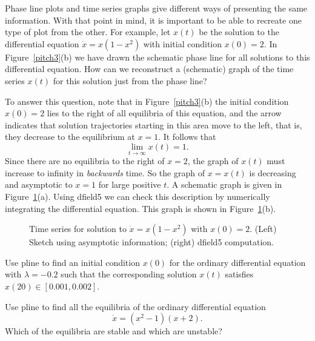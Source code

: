 Phase line plots and time series graphs give different ways of
presenting the same information.  With that point in mind, it is
important to be able to recreate one type of plot from
the other.  For example, let $x(t)$ be the solution to the
differential equation $\dot{x}=x(1-x^2)$ with initial condition $x(0)=2$.
In Figure~\ref{pitch3}(b) we have drawn the schematic phase line for
all solutions to this differential equation. How can we reconstruct
a (schematic) graph of the time series $x(t)$ for this solution just
from the phase line?

To answer this question, note that in Figure~\ref{pitch3}(b) the
initial condition $x(0)=2$ lies to the right of all equilibria of
this equation, and the arrow indicates that solution trajectories
starting in this area move to the left, that is, they decrease to
the equilibrium at $x=1$.  It follows that
\[
\lim_{t\to\infty} x(t) = 1.
\]
Since there are no equilibria to the right of $x=2$, the graph of $x(t)$
must increase to infinity in {\em backwards\/} time.  So the graph of 
$x=x(t)$ is decreasing and asymptotic to $x=1$ for large positive $t$.  
A schematic graph is given in Figure~\ref{pitch3a}(a).  Using {\sf dfield5} 
we can check this description by numerically integrating the differential
equation.   This graph is shown in Figure~\ref{pitch3a}(b).

\begin{figure}[htb]
       \centerline{%
	}
       \caption{Time series for solution to $\dot{x}=x(1-x^2)$ with $x(0)=2$.
	(Left) Sketch using asymptotic information; (right) {\sf dfield5}
	computation.}
       \label{pitch3a}
\end{figure}



\EXER

\CEXER

\begin{exercise} \label{c3.3.1}
Use {\sf pline} to find an initial condition $x(0)$ for the
ordinary differential equation  with $\lambda=-0.2$
such that the corresponding solution $x(t)$ satisfies
$x(20)\in[0.001,0.002]$.
\end{exercise}

\begin{exercise} \label{c3.3.2}
Use {\sf pline} to find all the equilibria of the ordinary
differential equation
\[
\dot{x} = (x^2-1)(x+2).
\]
Which of the equilibria are stable and which are unstable?
\end{exercise}

